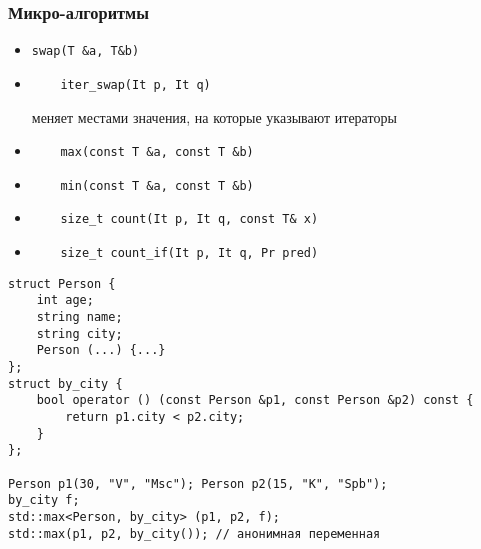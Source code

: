 \subsubsection{Микро-алгоритмы}
\begin{itemize}[noitemsep]
	\item \begin{verbatim}
swap(T &a, T&b)
	\end{verbatim}
\item 
	\begin{verbatim}
	iter_swap(It p, It q)
	\end{verbatim} 
	меняет местами значения, на которые указывают итераторы
\item 
	\begin{verbatim}
	max(const T &a, const T &b)
	\end{verbatim}
\item 
	\begin{verbatim}
	min(const T &a, const T &b)
	\end{verbatim}
\item 
	\begin{verbatim}
	size_t count(It p, It q, const T& x)
	\end{verbatim}
\item 
	\begin{verbatim}
	size_t count_if(It p, It q, Pr pred)
	\end{verbatim}
\end{itemize}
\begin{verbatim}
struct Person {
    int age;
	string name;
	string city;
	Person (...) {...}
};
struct by_city {
    bool operator () (const Person &p1, const Person &p2) const {
		return p1.city < p2.city;
	}
};

Person p1(30, "V", "Msc"); Person p2(15, "K", "Spb");
by_city f;
std::max<Person, by_city> (p1, p2, f);
std::max(p1, p2, by_city()); // анонимная переменная
\end{verbatim}
